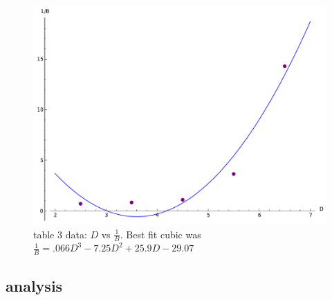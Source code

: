 \documentclass[12pt]{article}
\begin{document}
	\begin{figure}[hp]
	 \centering
	 \includegraphics[scale = .85]{plot3}
	 \caption*{table 3 data: $D$ vs $\frac{1}{B}$. Best fit cubic was $ \frac{1}{B} = .066D^3  - 7.25D^2 + 25.9D - 29.07 $}
	\end{figure} 
	\FloatBarrier

\subsection*{analysis}
\end{document}
